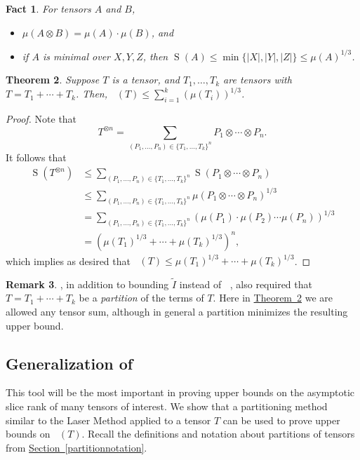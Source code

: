 \documentclass[11pt]{article}
\numberwithin{equation}{section}
\newtheorem{theorem}{Theorem}[section]
\newtheorem{fact}[theorem]{Fact}
\theoremstyle{definition}
\newtheorem{remark}[theorem]{Remark}
\theoremstyle{plain}
\newcommand{\expref}[2]{\hyperref[#2]{#1~\ref{#2}}}
\newcommand{\sr}{\mathop{\operatorname{S}}}
\newcommand{\tsr}{\mathop{\tilde{\operatorname{S}}}}
\theoremstyle{definition}
\begin{document}
\begin{fact}
For tensors $A$ and $B$,
\begin{itemize}
    \item $\mu(A \otimes B) = \mu(A) \cdot \mu(B)$, and
    \item if $A$ is minimal over $X,Y,Z$, then $\sr(A) \leq \min\{ |X|, |Y|, |Z| \} \leq \mu(A)^{1/3}$.
\end{itemize} 
\end{fact}

\begin{theorem} \label{one}
Suppose $T$ is a tensor, and $T_1, \ldots, T_k$ are tensors with $T = T_1 + \cdots + T_k$. Then, $\tsr(T) \leq \sum_{i=1}^k (\mu(T_i))^{1/3}$.
\end{theorem}

\begin{proof}
Note that
$$T^{\otimes n} = \sum_{(P_1, \ldots, P_n) \in \{ T_1, \ldots, T_k\}^n} P_1 \otimes \cdots \otimes P_n.$$
It follows that
\begin{align*}\sr(T^{\otimes n}) &\leq \sum_{(P_1, \ldots, P_n) \in \{ T_1, \ldots, T_k\}^n} \sr(P_1 \otimes \cdots \otimes P_n) \\&\leq \sum_{(P_1, \ldots, P_n) \in \{ T_1, \ldots, T_k\}^n} \mu(P_1 \otimes \cdots \otimes P_n)^{1/3} \\&= \sum_{(P_1, \ldots, P_n) \in \{ T_1, \ldots, T_k\}^n} (\mu(P_1) \cdot \mu(P_2) \cdots \mu(P_n))^{1/3} \\&= (\mu(T_1)^{1/3} + \cdots + \mu(T_k)^{1/3})^{n},\end{align*}
which implies as desired that $\tsr(T) \leq \mu(T_1)^{1/3} + \cdots + \mu(T_k)^{1/3}$.
\end{proof}

\begin{remark}
\cite[Theorem~5.3]{aw}, in addition to bounding $\tilde{I}$ instead of $\tsr$, also required that $T = T_1 + \cdots + T_k$ be a \emph{partition} of the terms of $T$. Here in \expref{Theorem}{one} we are allowed any tensor sum, although in general a partition minimizes the resulting upper bound.
\end{remark}

%

\subsection{Generalization of \cite[Theorem~5.2]{aw}} \label{subsectwo}

This tool will be the most important in
%
proving upper bounds on  %
the asymptotic slice rank of many tensors of interest. We show that a partitioning method similar to the Laser Method applied to a tensor $T$ can be used to prove upper bounds on $\tsr(T)$. Recall the definitions and notation about partitions of tensors from \expref{Section}{partitionnotation}.
\end{document}
